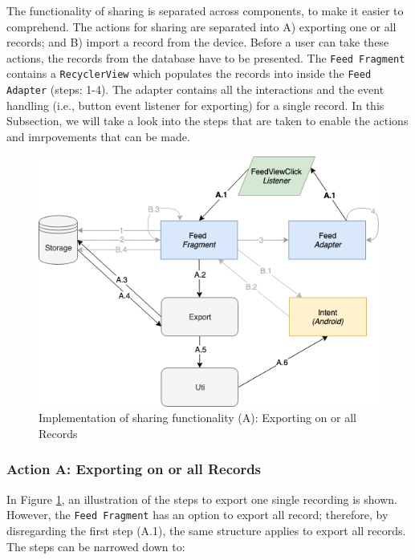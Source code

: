The functionality of sharing is separated across components, to make it easier to comprehend. The actions for sharing are separated into A) exporting one or all records; and B) import a record from the device. Before a user can take these actions, the records from the database have to be presented. The \verb|Feed Fragment| contains a \verb|RecyclerView| which populates the records into inside the \verb|Feed Adapter| (steps: 1-4). The adapter contains all the interactions and the event handling (i.e., button event listener for exporting) for a single record. In this Subsection, we will take a look into the steps that are taken to enable the actions and imrpovements that can be made.

\begin{figure}
    \centering
    \includegraphics[scale=0.6]{images/Sharing_ImpA.png}
    \caption{Implementation of sharing functionality (A): Exporting on or all Records}
    \label{fig:impl_sharingA}
\end{figure}

\subsubsection{Action A: Exporting on or all Records}
In Figure \ref{fig:impl_sharingA}, an illustration of the steps to export one single recording is shown. However, the \verb|Feed Fragment| has an option to export all record; therefore, by disregarding the first step (A.1), the same structure applies to export all records. The steps can be narrowed down to: 

